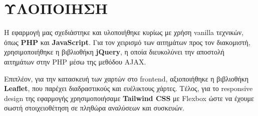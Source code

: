 \chapter{ΥΛΟΠΟΙΗΣΗ}
    Η εφαρμογή μας σχεδιάστηκε και υλοποιήθηκε κυρίως με χρήση vanilla τεχνικών, όπως \textbf{PHP} και \textbf{JavaScript}.
    Για τον χειρισμό των αιτημάτων προς τον διακομιστή, χρησιμοποιήθηκε η βιβλιοθήκη \textbf{jQuery}, η οποία διευκολύνει την αποστολή αιτημάτων στην PHP μέσω της μεθόδου AJAX.

    Επιπλέον, για την κατασκευή των χαρτών στο frontend, αξιοποιήθηκε η βιβλιοθήκη \textbf{Leaflet}, που παρέχει διαδραστικούς και ευέλικτους χάρτες.
    Τέλος, για το responsive design της εφαρμογής χρησιμοποιήσαμε \textbf{Tailwind CSS} με Flexbox ώστε να έχουμε σωστή στοιχειοθέτηση σε πληθώρα αναλύσεων και συσκευών.